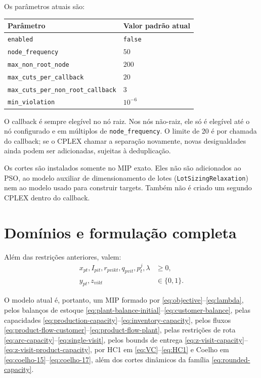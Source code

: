 \documentclass[11pt,a4paper]{article}
\begin{document}
Os parâmetros atuais são:
\begin{center}
\begin{tabular}{ll}
\toprule
Parâmetro & Valor padrão atual \\
\midrule
\texttt{enabled} & \texttt{false} \\
\texttt{node\_frequency} & $50$ \\
\texttt{max\_non\_root\_node} & $200$ \\
\texttt{max\_cuts\_per\_callback} & $20$ \\
\texttt{max\_cuts\_per\_non\_root\_callback} & $3$ \\
\texttt{min\_violation} & $10^{-6}$ \\
\bottomrule
\end{tabular}
\end{center}

O callback é sempre elegível no nó raiz. Nos nós não-raiz, ele só é elegível
até o nó configurado e em múltiplos de \texttt{node\_frequency}. O limite de
20 é por chamada do callback; se o CPLEX chamar a separação novamente, novas
desigualdades ainda podem ser adicionadas, sujeitas à deduplicação.

Os cortes são instalados somente no MIP exato. Eles não são adicionados ao
PSO, ao modelo auxiliar de dimensionamento de lotes
(\texttt{LotSizingRelaxation}) nem ao modelo usado para construir targets.
Também não é criado um segundo CPLEX dentro do callback.

\section{Domínios e formulação completa}

Além das restrições anteriores, valem:
\begin{align}
  x_{pt},I_{pit},r_{pvikt},q_{pvit},p_t^j,\lambda &\ge0,
  \label{eq:nonnegative}\\
  y_{pt},z_{vikt} &\in\{0,1\}.
  \label{eq:binary}
\end{align}

O modelo atual é, portanto, um MIP formado por
\eqref{eq:objective}--\eqref{eq:lambda}, pelos balanços de estoque
\eqref{eq:plant-balance-initial}--\eqref{eq:customer-balance}, pelas
capacidades \eqref{eq:production-capacity}--\eqref{eq:inventory-capacity},
pelos fluxos \eqref{eq:product-flow-customer}--\eqref{eq:product-flow-plant},
pelas restrições de rota \eqref{eq:arc-capacity}--\eqref{eq:single-visit},
pelos bounds de entrega \eqref{eq:z-visit-capacity}--
\eqref{eq:z-visit-product-capacity}, por HC1 em \eqref{eq:VC}--\eqref{eq:HC1} e Coelho em
\eqref{eq:coelho-15}--\eqref{eq:coelho-17}, além dos cortes dinâmicos da
família \eqref{eq:rounded-capacity}.
\end{document}
